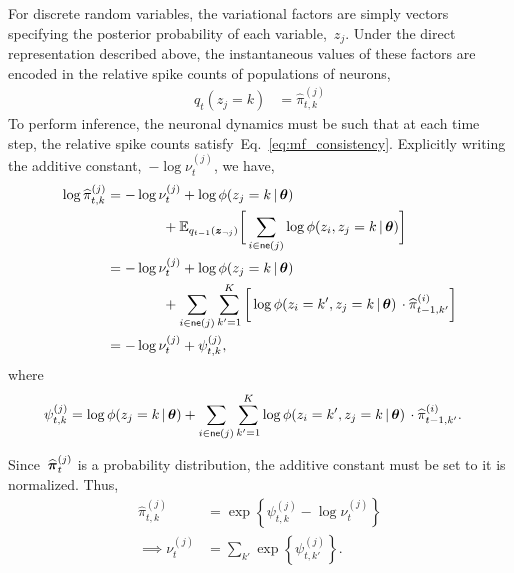 For discrete random variables, the variational factors are simply
vectors specifying the posterior probability of each variable,~$z_j$.
Under the direct representation described above, the instantaneous
values of these factors are encoded in the relative spike counts of
populations of neurons,
\begin{align*}
  q_t(z_j=k) &= \widehat{\pi}_{t,k}^{(j)} 
\end{align*}
To perform inference, the neuronal dynamics must be such that at each
time step, the relative spike counts satisfy~Eq.~\ref{eq:mf_consistency}. 
Explicitly writing the additive constant,~$-\log \nu_t^{(j)}$, we have,
\begin{align}
  \nonumber
  \log \widehat{\pi}_{t,k}^{(j)} 
  &= -\log \nu_t^{(j)} + \log \phi(z_j=k \,|\, \boldsymbol{\theta}) \\
  \nonumber
  &\hspace{4em} + \mathbb{E}_{q_{t-1}(\boldsymbol{z}_{\neg j})} \bigg[
  \sum_{i \in \mathsf{ne}(j)} \log \phi(z_{i}, z_j=k \,|\, \boldsymbol{\theta}) \bigg] \\
  & \nonumber = 
     - \log \nu_t^{(j)} + \log \phi(z_j=k \,|\, \boldsymbol{\theta}) \\
  &   \label{eq:variational_rate}
  \hspace{4em} + \sum_{i \in \mathsf{ne}(j)} \sum_{k'=1}^K
  \bigg[\log \phi(z_{i}=k', z_j=k \,|\, \boldsymbol{\theta}) \,\cdot  \widehat{\pi}_{t-1,k'}^{(i)} \bigg] \\
  \nonumber
  &= -\log \nu_t^{(j)} + \psi_{t,k}^{(j)},
\end{align}
where
\begin{align*}
  \psi_{t,k}^{(j)} &=
  \log \phi(z_j=k \,|\, \boldsymbol{\theta})
  + \sum_{i \in \mathsf{ne}(j)} \sum_{k'=1}^K
  \log \phi(z_{i}=k', z_j=k \,|\, \boldsymbol{\theta}) \,\cdot  \widehat{\pi}_{t-1,k'}^{(i)}.
\end{align*}

Since~$\widehat{\boldsymbol{\pi}}_{t}^{(j)}$ is a probability distribution, 
 the additive constant must be set to it is normalized.  Thus,
\begin{align*}
  \widehat{\pi}_{t,k}^{(j)} &=
  \exp \left \{\psi_{t,k}^{(j)} -\log \nu_{t}^{(j)} \right \} \\
  \implies
  \nu_t^{(j)} &= \sum_{k'} \exp \left \{\psi_{t,k'}^{(j)} \right \}.
\end{align*}


